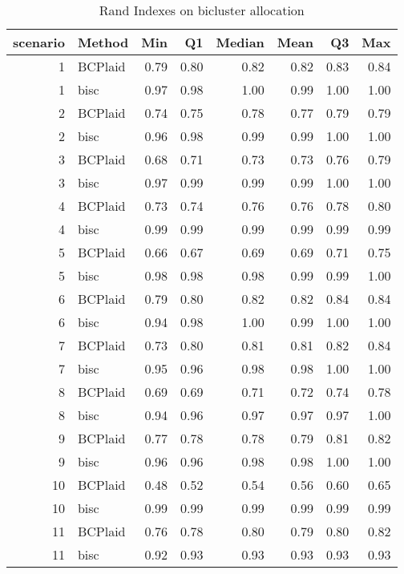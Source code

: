 \begin{table}[ht]
\caption{Rand Indexes on bicluster allocation}
\vspace{1.5cm}
\centering
\begin{tabular}{rlrrrrrr}
  \toprule
scenario & Method & Min & Q1 & Median & Mean & Q3 & Max \\ 
  \midrule
  1 & BCPlaid & 0.79 & 0.80 & 0.82 & 0.82 & 0.83 & 0.84 \\ 
    1 & bisc & 0.97 & 0.98 & 1.00 & 0.99 & 1.00 & 1.00 \\ 
    2 & BCPlaid & 0.74 & 0.75 & 0.78 & 0.77 & 0.79 & 0.79 \\ 
    2 & bisc & 0.96 & 0.98 & 0.99 & 0.99 & 1.00 & 1.00 \\ 
    3 & BCPlaid & 0.68 & 0.71 & 0.73 & 0.73 & 0.76 & 0.79 \\ 
    3 & bisc & 0.97 & 0.99 & 0.99 & 0.99 & 1.00 & 1.00 \\ 
    4 & BCPlaid & 0.73 & 0.74 & 0.76 & 0.76 & 0.78 & 0.80 \\ 
    4 & bisc & 0.99 & 0.99 & 0.99 & 0.99 & 0.99 & 0.99 \\ 
    5 & BCPlaid & 0.66 & 0.67 & 0.69 & 0.69 & 0.71 & 0.75 \\ 
    5 & bisc & 0.98 & 0.98 & 0.98 & 0.99 & 0.99 & 1.00 \\ 
    6 & BCPlaid & 0.79 & 0.80 & 0.82 & 0.82 & 0.84 & 0.84 \\ 
    6 & bisc & 0.94 & 0.98 & 1.00 & 0.99 & 1.00 & 1.00 \\ 
    7 & BCPlaid & 0.73 & 0.80 & 0.81 & 0.81 & 0.82 & 0.84 \\ 
    7 & bisc & 0.95 & 0.96 & 0.98 & 0.98 & 1.00 & 1.00 \\ 
    8 & BCPlaid & 0.69 & 0.69 & 0.71 & 0.72 & 0.74 & 0.78 \\ 
    8 & bisc & 0.94 & 0.96 & 0.97 & 0.97 & 0.97 & 1.00 \\ 
    9 & BCPlaid & 0.77 & 0.78 & 0.78 & 0.79 & 0.81 & 0.82 \\ 
    9 & bisc & 0.96 & 0.96 & 0.98 & 0.98 & 1.00 & 1.00 \\ 
   10 & BCPlaid & 0.48 & 0.52 & 0.54 & 0.56 & 0.60 & 0.65 \\ 
   10 & bisc & 0.99 & 0.99 & 0.99 & 0.99 & 0.99 & 0.99 \\ 
   11 & BCPlaid & 0.76 & 0.78 & 0.80 & 0.79 & 0.80 & 0.82 \\ 
   11 & bisc & 0.92 & 0.93 & 0.93 & 0.93 & 0.93 & 0.93 \\ 

\end{tabular}
\end{table}
